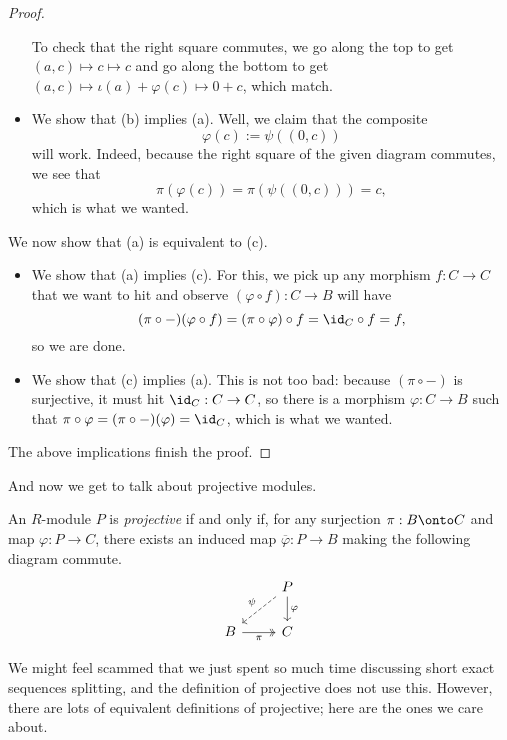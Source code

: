 \begin{proof}
\begin{itemize}
		To check that the right square commutes, we go along the top to get $(a,c)\mapsto c\mapsto c$ and go along the bottom to get $(a,c)\mapsto\iota(a)+\varphi(c)\mapsto 0+c$, which match.

		\item We show that (b) implies (a). Well, we claim that the composite
		\[\varphi(c):=\psi((0,c))\]
		will work. Indeed, because the right square of the given diagram commutes, we see that
		\[\pi(\varphi(c))=\pi(\psi((0,c)))=c,\]
		which is what we wanted.
	\end{itemize}
	We now show that (a) is equivalent to (c).
	\begin{itemize}
		\item We show that (a) implies (c). For this, we pick up any morphism $f:C\to C$ that we want to hit and observe $(\varphi\circ f):C\to B$ will have
		\[(\pi\circ-)(\varphi\circ f)=(\pi\circ\varphi)\circ f=\id_C\circ f=f,\]
		so we are done.
		
		\item We show that (c) implies (a). This is not too bad: because $(\pi\circ-)$ is surjective, it must hit $\id_C:C\to C$, so there is a morphism $\varphi:C\to B$ such that $\pi\circ\varphi=(\pi\circ-)(\varphi)=\id_C$, which is what we wanted.
	\end{itemize}
	The above implications finish the proof.
\end{proof}
And now we get to talk about projective modules.
\begin{definition}[Projective] \label{def:projective}
	An $R$-module $P$ is \textit{projective} if and only if, for any surjection $\pi:B\onto C$ and map $\varphi:P\to C$, there exists an induced map $\overline\varphi:P\to B$ making the following diagram commute.
	\[\begin{tikzcd}
		& P \\
		B & {C}
		\arrow["\pi"', two heads, from=2-1, to=2-2]
		\arrow["\varphi", from=1-2, to=2-2]
		\arrow["\psi"', dashed, from=1-2, to=2-1]
	\end{tikzcd}\]
\end{definition}
We might feel scammed that we just spent so much time discussing short exact sequences splitting, and the definition of projective does not use this. However, there are lots of equivalent definitions of projective; here are the ones we care about.
